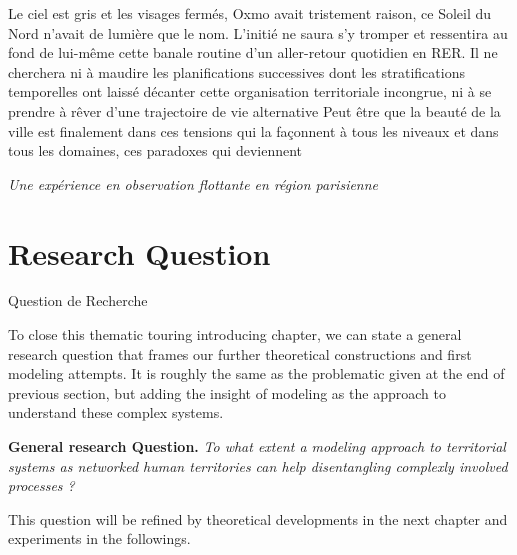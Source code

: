 \begin{mdframed}
Le ciel est gris et les visages fermés, Oxmo avait tristement raison, ce Soleil du Nord n'avait de lumière que le nom. L'initié ne saura s'y tromper et ressentira au fond de lui-même cette banale routine d'un aller-retour quotidien en RER. Il ne cherchera ni à maudire les planifications successives dont les stratifications temporelles ont laissé décanter cette organisation territoriale incongrue, ni à se prendre à rêver d'une trajectoire de vie alternative
Peut être que la beauté de la ville est finalement dans ces tensions qui la façonnent à tous les niveaux et dans tous les domaines, ces paradoxes qui deviennent

 \textit{Une expérience en observation flottante en région parisienne}
\end{mdframed}








\section{Research Question}{Question de Recherche}

To close this thematic touring introducing chapter, we can state a general research question that frames our further theoretical constructions and first modeling attempts. It is roughly the same as the problematic given at the end of previous section, but adding the insight of modeling as the approach to understand these complex systems.


\medskip

\textbf{General research Question.} \textit{To what extent a modeling approach to territorial systems as networked human territories can help disentangling complexly involved processes ?}

\medskip

This question will be refined by theoretical developments in the next chapter and experiments in the followings.







